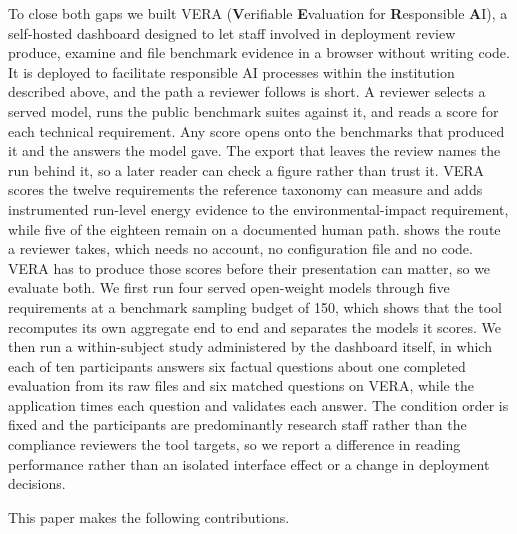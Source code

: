 \documentclass[10pt,conference,a4paper]{IEEEtran}
\begin{document}
To close both gaps we built VERA (\textbf{V}erifiable \textbf{E}valuation for \textbf{R}esponsible \textbf{A}I), a self-hosted dashboard designed to let staff involved in deployment review produce, examine and file benchmark evidence in a browser without writing code.
It is deployed to facilitate responsible AI processes within the institution described above, and the path a reviewer follows is short.
A reviewer selects a served model, runs the public benchmark suites against it, and reads a score for each technical requirement.
Any score opens onto the benchmarks that produced it and the answers the model gave.
The export that leaves the review names the run behind it, so a later reader can check a figure rather than trust it.
VERA scores the twelve requirements the reference taxonomy can measure and adds instrumented run-level energy evidence to the environmental-impact requirement, while five of the eighteen remain on a documented human path.
 shows the route a reviewer takes, which needs no account, no configuration file and no code.
VERA has to produce those scores before their presentation can matter, so we evaluate both.
We first run four served open-weight models through five requirements at a benchmark sampling budget of 150, which shows that the tool recomputes its own aggregate end to end and separates the models it scores.
We then run a within-subject study administered by the dashboard itself, in which each of ten participants answers six factual questions about one completed evaluation from its raw files and six matched questions on VERA, while the application times each question and validates each answer.
The condition order is fixed and the participants are predominantly research staff rather than the compliance reviewers the tool targets, so we report a difference in reading performance rather than an isolated interface effect or a change in deployment decisions.

This paper makes the following contributions.
\end{document}
